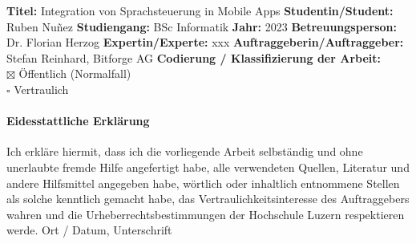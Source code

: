 \documentclass[main.tex]{subfiles} %
\begin{document}
\vspace*{0.6cm}

\noindent
\textbf{Titel:} Integration von Sprachsteuerung in Mobile Apps \newline \newline
\textbf{Studentin/Student:} Ruben Nuñez \newline \newline
\textbf{Studiengang:} BSc Informatik \newline \newline
\textbf{Jahr:} 2023 \newline \newline
\textbf{Betreuungsperson:} Dr. Florian Herzog \newline \newline
\textbf{Expertin/Experte:} xxx \newline \newline
\textbf{Auftraggeberin/Auftraggeber:} Stefan Reinhard, Bitforge AG \newline \newline
\textbf{Codierung / Klassifizierung der Arbeit:} \\
$\boxtimes$ Öffentlich (Normalfall) \\
$\square$ Vertraulich \\




\paragraph{\textbf{Eidesstattliche Erklärung}}
Ich erkläre hiermit, dass ich die vorliegende Arbeit selbständig und ohne unerlaubte fremde
Hilfe angefertigt habe, alle verwendeten Quellen, Literatur und andere Hilfsmittel angegeben
habe, wörtlich oder inhaltlich entnommene Stellen als solche kenntlich gemacht habe, das
Vertraulichkeitsinteresse des Auftraggebers wahren und die Urheberrechtsbestimmungen der
Hochschule Luzern respektieren werde.
\newline
\newline
Ort / Datum, Unterschrift	\underline{\hspace*{4cm}}
\newline
\newline
\end{document}
